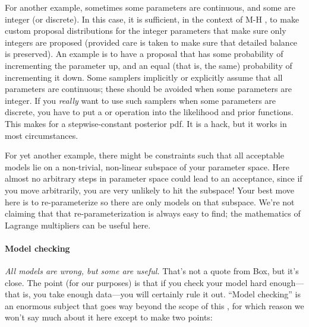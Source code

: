 \documentclass[modern]{aastex61}
\newcommand{\MCMC}{\acronym{MCMC}}
\begin{document}
For another example, sometimes some parameters are continuous, and some
are integer (or discrete).
In this case, it is sufficient, in the context of M-H \MCMC, to make
custom proposal distributions for the integer parameters that make sure
only integers are proposed (provided care is taken to make sure that detailed
balance is preserved).
An example is to have a proposal that has some probability of
incrementing the parameter up, and an equal (that is, the same) probability
of incrementing it down.
Some samplers implicitly or explicitly assume that all parameters are
continuous; these should be avoided
when some parameters are integer.
If you \emph{really} want to use such samplers when some parameters
are discrete, you have to put a  or 
operation into the likelihood and prior functions.
This makes for a stepwise-constant posterior pdf. It is a hack, but it
works in most circumstances.

For yet another example, there might be constraints such that all
acceptable models lie on a non-trivial, non-linear subspace of your
parameter space.
Here almost no arbitrary steps in parameter space could lead to an
acceptance, since if you move arbitrarily, you are very unlikely to
hit the subspace!
Your best move here is to re-parameterize so there are only models on
that subspace.
We're not claiming that that re-parameterization is always easy to
find; the mathematics of Lagrange multipliers can be useful here.

\paragraph{Model checking}
\emph{All models are wrong, but some are useful.}
That's not a quote from Box, but it's close.
The point (for our purposes) is that if you check your model hard
enough---that is, you take enough data---you will certainly rule it
out.
``Model checking'' is an enormous subject that goes way beyond the
scope of this \documentname, for which reason we won't say much about
it here except to make two points:
\end{document}

